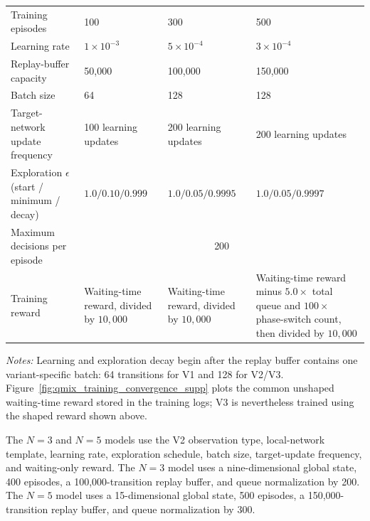 \documentclass[12pt]{article}
\begin{document}
\begin{table}[H]
{\begin{tabular}{p{4.2cm}p{3.5cm}p{3.5cm}p{5.8cm}}
Training episodes &
100 &
300 &
500 \\

Learning rate &
$1\times10^{-3}$ &
$5\times10^{-4}$ &
$3\times10^{-4}$ \\

Replay-buffer capacity &
50{,}000 &
100{,}000 &
150{,}000 \\

Batch size &
64 &
128 &
128 \\

Target-network update frequency &
100 learning updates &
200 learning updates &
200 learning updates \\

Exploration $\epsilon$
(start / minimum / decay) &
$1.0/0.10/0.999$ &
$1.0/0.05/0.9995$ &
$1.0/0.05/0.9997$ \\

Maximum decisions per episode &
\multicolumn{3}{c}{200} \\

Training reward &
Waiting-time reward, divided by $10{,}000$ &
Waiting-time reward, divided by $10{,}000$ &
Waiting-time reward minus
$5.0\times$ total queue and
$100\times$ phase-switch count,
then divided by $10{,}000$ \\

\bottomrule
\end{tabular}%
}

\vspace{4pt}
\begin{minipage}{0.98\textwidth}
\footnotesize
\emph{Notes:}
Learning and exploration decay begin after the replay buffer contains one
variant-specific batch: 64 transitions for V1 and 128 for V2/V3.
Figure~\ref{fig:qmix_training_convergence_supp} plots the common
unshaped waiting-time reward stored in the training logs; V3 is nevertheless
trained using the shaped reward shown above.

The $N=3$ and $N=5$ models use the V2 observation type, local-network
template, learning rate, exploration schedule, batch size, target-update
frequency, and waiting-only reward. The $N=3$ model uses a
nine-dimensional global state, 400 episodes, a 100{,}000-transition replay
buffer, and queue normalization by 200. The $N=5$ model uses a
15-dimensional global state, 500 episodes, a 150{,}000-transition replay
buffer, and queue normalization by 300.
\end{minipage}
\end{table}
\end{document}
